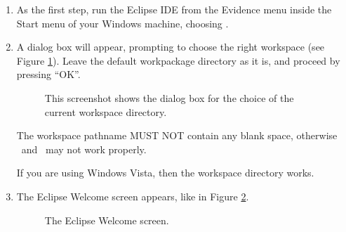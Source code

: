 \begin{enumerate}
\item As the first step, run the Eclipse IDE from the Evidence menu
  inside the Start menu of your Windows machine, choosing 
  .
  
\item A dialog box will appear, prompting to choose the right
  workspace (see Figure \ref{fig:select-workspace}). 
  Leave the default workpackage directory
  as it is, and proceed by pressing ``OK''.
%
\begin{figure}[htb]
\caption{This screenshot shows the
dialog box for the choice of the current workspace directory.}
\label{fig:select-workspace}
\end{figure}

\begin{warning}
The workspace pathname MUST NOT contain any blank space, otherwise 
\ee\ and \rtd\ may not work properly.
\end{warning}

\begin{note}
If you are using Windows Vista, then the workspace directory  works.
\end{note}


\item
  The Eclipse Welcome screen appears, like in Figure \ref{fig:welcome}.
%
\begin{figure}[htb]
\caption{The Eclipse Welcome screen.}
\label{fig:welcome}
\end{figure}


\end{enumerate}
